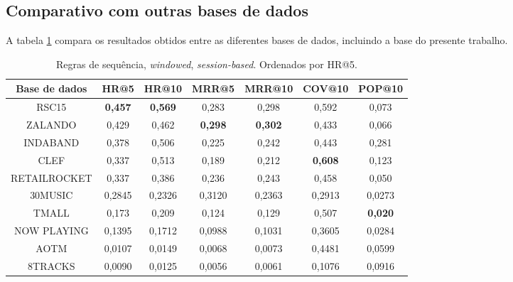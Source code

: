 \subsection{Comparativo com outras bases de dados}
A tabela \ref{tab:sr} compara os resultados obtidos entre as diferentes bases de
dados, incluindo a base do presente trabalho.

\begin{table}[htbp]
\centering
\vspace{1mm}
\begin{tabular}{ccccccc}
\hline
Base de dados & HR@5 & HR@10 & MRR@5 & MRR@10 & COV@10 & POP@10 \\
\hline
RSC15 & \textbf{0,457} & \textbf{0,569} & 0,283 & 0,298 & 0,592 & 0,073 \\
ZALANDO & 0,429 & 0,462 & \textbf{0,298} & \textbf{0,302} & 0,433 & 0,066 \\
INDABAND & 0,378 & 0,506 & 0,225 & 0,242 & 0,443 & 0,281 \\
CLEF & 0,337 & 0,513 & 0,189 & 0,212 & \textbf{0,608} & 0,123 \\
RETAILROCKET &  0,337 & 0,386 & 0,236 & 0,243 & 0,458 & 0,050 \\
30MUSIC & 0,2845 & 0,2326 & 0,3120  & 0,2363 & 0,2913 & 0,0273 \\
TMALL &  0,173 & 0,209 & 0,124 & 0,129 & 0,507 & \textbf{0,020} \\
NOW PLAYING & 0,1395 & 0,1712 & 0,0988 & 0,1031 & 0,3605 & 0,0284 \\
AOTM & 0,0107 & 0,0149 & 0,0068 & 0,0073 & 0,4481 & 0,0599 \\
8TRACKS & 0,0090 & 0,0125 & 0,0056 & 0,0061 & 0,1076 & 0,0916 \\
\hline
\end{tabular}
\caption{Regras de sequência, \textit{windowed}, \textit{session-based}. Ordenados por HR@5.}
\label{tab:sr}
\end{table}